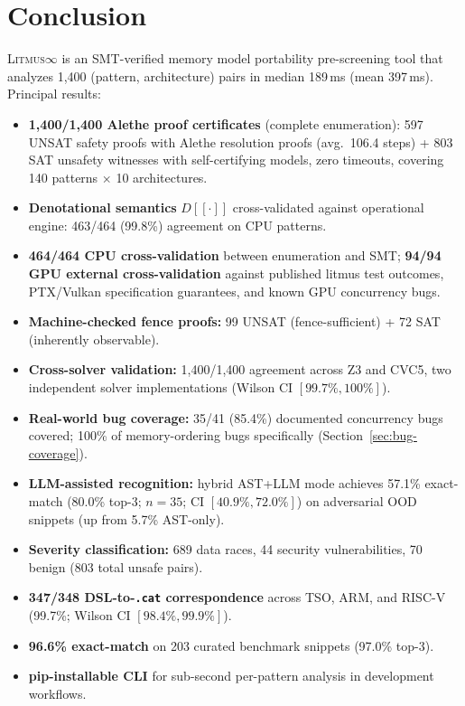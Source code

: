 \documentclass[11pt]{article}
\newcommand{\litmus}{\textsc{Litmus$\infty$}}
\begin{document}
\section{Conclusion}
\label{sec:conclusion}

\litmus{} is an SMT-verified memory model portability pre-screening
tool that analyzes 1{,}400 (pattern, architecture) pairs in median
189\,ms (mean 397\,ms).
Principal results:

\begin{itemize}[nosep]
\item \textbf{1{,}400/1{,}400 Alethe proof certificates} (complete enumeration):
  597 UNSAT safety proofs with Alethe resolution proofs (avg.\ 106.4 steps) +
  803 SAT unsafety witnesses with self-certifying models, zero timeouts,
  covering 140 patterns $\times$ 10 architectures.
\item \textbf{Denotational semantics} $D[\![\cdot]\!]$ cross-validated
  against operational engine: 463/464 (99.8\%) agreement on CPU patterns.
\item \textbf{464/464 CPU cross-validation} between enumeration and SMT;
  \textbf{94/94 GPU external cross-validation} against published
  litmus test outcomes, PTX/Vulkan specification guarantees,
  and known GPU concurrency bugs.
\item \textbf{Machine-checked fence proofs:} 99 UNSAT
  (fence-sufficient) + 72 SAT (inherently observable).
\item \textbf{Cross-solver validation:} 1{,}400/1{,}400 agreement
  across Z3 and CVC5, two independent solver implementations
  (Wilson CI $[99.7\%, 100\%]$).
\item \textbf{Real-world bug coverage:} 35/41 (85.4\%) documented
  concurrency bugs covered; 100\% of memory-ordering bugs
  specifically (Section~\ref{sec:bug-coverage}).
\item \textbf{LLM-assisted recognition:} hybrid AST+LLM mode achieves
  57.1\% exact-match (80.0\% top-3; $n=35$; CI $[40.9\%, 72.0\%]$)
  on adversarial OOD snippets (up from 5.7\% AST-only).
\item \textbf{Severity classification:} 689 data races, 44
  security vulnerabilities, 70 benign (803 total unsafe pairs).
\item \textbf{347/348 DSL-to-\texttt{.cat} correspondence}
  across TSO, ARM, and RISC-V (99.7\%; Wilson CI $[98.4\%, 99.9\%]$).
\item \textbf{96.6\% exact-match} on 203 curated benchmark snippets
  (97.0\% top-3).
\item \textbf{pip-installable CLI} for sub-second
  per-pattern analysis in development workflows.
\end{itemize}
\end{document}
